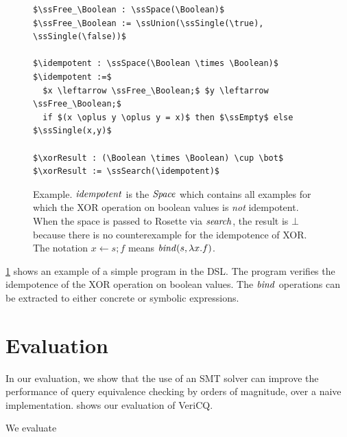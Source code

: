 \begin{figure}
\begin{lstlisting}
$\ssFree_\Boolean : \ssSpace(\Boolean)$
$\ssFree_\Boolean := \ssUnion(\ssSingle(\true), \ssSingle(\false))$

$\idempotent : \ssSpace(\Boolean \times \Boolean)$
$\idempotent :=$
  $x \leftarrow \ssFree_\Boolean;$ $y \leftarrow \ssFree_\Boolean;$
  if $(x \oplus y \oplus y = x)$ then $\ssEmpty$ else $\ssSingle(x,y)$

$\xorResult : (\Boolean \times \Boolean) \cup \bot$
$\xorResult := \ssSearch(\idempotent)$
\end{lstlisting}
\caption{
\SpaceSearch Example. $\mathit{idempotent}$ is the $\mathit{Space}$ which contains all examples for
which the XOR operation on boolean values is \emph{not} idempotent. When the space is
passed to Rosette via $\mathit{search}$, the result is $\bot$ because there is no
counterexample for the idempotence of XOR. The notation $x \leftarrow s; f$
means $\mathit{bind}(s,\lambda x. f)$.
}
\label{fig:rosette-example}
\end{figure}

\cref{fig:rosette-example} shows an example of a simple program in the \SpaceSearch DSL. The program verifies the idempotence of
the XOR operation on boolean values. The $\mathit{bind}$ operations can be extracted 
to either concrete or symbolic expressions.




\section{Evaluation}

In our evaluation, we show that the use of an SMT
solver can improve the performance of query equivalence checking by
orders of magnitude, over a naive implementation. 
shows our evaluation of VeriCQ.

We evaluate 


